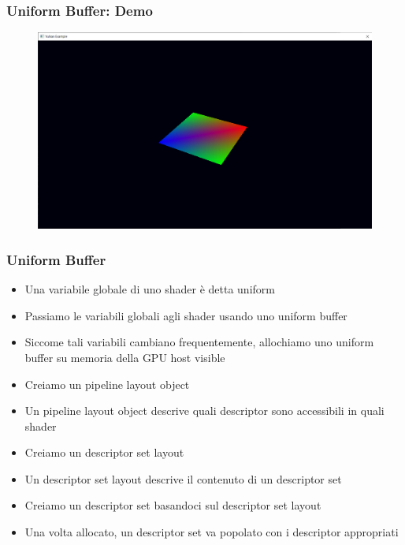 \begin{frame}
\frametitle{Uniform Buffer: Demo}
\begin{figure}[ht]
    \centering
    \includegraphics[scale=0.25]{images/SlidesUniforms/RenderQuad.png}
\end{figure}
\end{frame}

\begin{frame}
\frametitle{Uniform Buffer}
\begin{itemize}
\item Una variabile globale di uno shader è detta uniform
\item Passiamo le variabili globali agli shader usando uno uniform buffer
\item Siccome tali variabili cambiano frequentemente, allochiamo uno uniform buffer su memoria della GPU host visible
\item Creiamo un pipeline layout object
\item Un pipeline layout object descrive quali descriptor sono accessibili in quali shader
\item Creiamo un descriptor set layout
\item Un descriptor set layout descrive il contenuto di un descriptor set
\item Creiamo un descriptor set basandoci sul descriptor set layout
\item Una volta allocato, un descriptor set va popolato con i descriptor appropriati
\end{itemize}
\end{frame}
